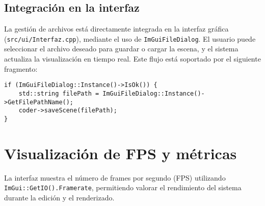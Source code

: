 \subsection{Integración en la interfaz}

La gestión de archivos está directamente integrada en la interfaz gráfica
(\texttt{src/ui/Interfaz.cpp}), mediante el uso de \texttt{ImGuiFileDialog}. El
usuario puede seleccionar el archivo deseado para guardar o cargar la escena, y
el sistema actualiza la visualización en tiempo real. Este flujo está soportado
por el siguiente fragmento:

\begin{verbatim}
if (ImGuiFileDialog::Instance()->IsOk()) {
    std::string filePath = ImGuiFileDialog::Instance()->GetFilePathName();
    coder->saveScene(filePath);
}
\end{verbatim}


\section{Visualización de FPS y métricas}

La interfaz muestra el número de frames por segundo (FPS) utilizando
\texttt{ImGui::GetIO().Framerate}, permitiendo valorar el rendimiento del
sistema durante la edición y el renderizado.
